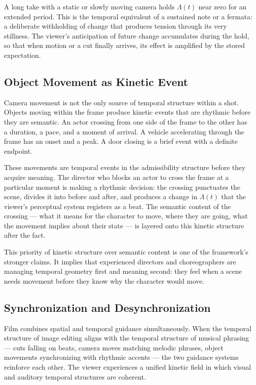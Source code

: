\documentclass[12pt, a4paper]{article}
\theoremstyle{plain}
\theoremstyle{definition}
\theoremstyle{remark}
\begin{document}
A long take with a static or slowly moving camera holds
$\Lambda(t)$ near zero for an extended period. This is the
temporal equivalent of a sustained note or a fermata: a
deliberate withholding of change that produces tension
through its very stillness. The viewer's anticipation of
future change accumulates during the hold, so that when
motion or a cut finally arrives, its effect is amplified
by the stored expectation.

\subsection{Object Movement as Kinetic Event}
\label{subsec:objectmovement}

Camera movement is not the only source of temporal structure
within a shot. Objects moving within the frame produce
kinetic events that are rhythmic before they are semantic.
An actor crossing from one side of the frame to the other
has a duration, a pace, and a moment of arrival. A vehicle
accelerating through the frame has an onset and a peak. A
door closing is a brief event with a definite endpoint.

These movements are temporal events in the admissibility
structure before they acquire meaning. The director who
blocks an actor to cross the frame at a particular moment is
making a rhythmic decision: the crossing punctuates the
scene, divides it into before and after, and produces a
change in $\Lambda(t)$ that the viewer's perceptual system
registers as a beat. The semantic content of the crossing ---
what it means for the character to move, where they are
going, what the movement implies about their state --- is
layered onto this kinetic structure after the fact.

This priority of kinetic structure over semantic content is
one of the framework's stronger claims. It implies that
experienced directors and choreographers are managing
temporal geometry first and meaning second: they feel when
a scene needs movement before they know why the character
would move.

\subsection{Synchronization and Desynchronization}
\label{subsec:sync}

Film combines spatial and temporal guidance simultaneously.
When the temporal structure of image editing aligns with the
temporal structure of musical phrasing --- cuts falling on
beats, camera moves matching melodic phrases, object
movements synchronizing with rhythmic accents --- the two
guidance systems reinforce each other. The viewer experiences
a unified kinetic field in which visual and auditory
temporal structures are coherent.
\end{document}
